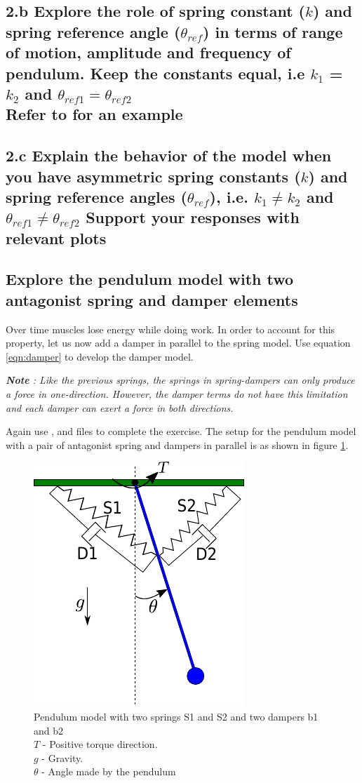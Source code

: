 \documentclass{cmc}
\begin{document}
\subsection*{2.b Explore the role of spring constant ($k$) and spring
  reference angle ($\theta_{ref}$) in terms of range of motion,
  amplitude and frequency of pendulum. Keep the constants equal, i.e
  $k_1$  = $k_2$ and $\theta_{ref1} = \theta_{ref2}$
  \\ Refer to  for an example}


\subsection*{2.c Explain the behavior of the model when you have
  asymmetric spring constants ($k$) and spring reference angles
  ($\theta_{ref}$), i.e. $k_1 \neq k_2$ and $\theta_{ref1} \neq \theta_{ref2}$
  Support your responses with relevant plots}


\subsection*{Explore the pendulum model with two antagonist spring and damper elements}
Over time muscles lose energy while doing work. In order to account
for this property, let us now add a damper in parallel to the spring
model. Use equation \ref{eqn:damper} to develop the damper model.

\textit{\textbf{Note} : Like the previous springs, the springs in spring-dampers
  can only produce a force in one-direction.  However, the damper terms do not
  have this limitation and each damper can exert a force in both directions.}

Again use ,  and
 files to complete the exercise. The
setup for the pendulum model with a pair of antagonist spring and
dampers in parallel is as shown in figure
\ref{fig:pendulum_spring_damper}.


\begin{figure}[H]
  \centering
  \includegraphics[width=.3\textwidth]{figures/pendulum_spring_damper}
  \caption[pendulum with spring]{Pendulum model with two springs S1
    and S2 and two dampers b1 and b2\\
    $T$ - Positive torque direction.\\
    $g$ - Gravity.\\
    $\theta$ - Angle made by the pendulum}
  \label{fig:pendulum_spring_damper}
\end{figure}
\end{document}
